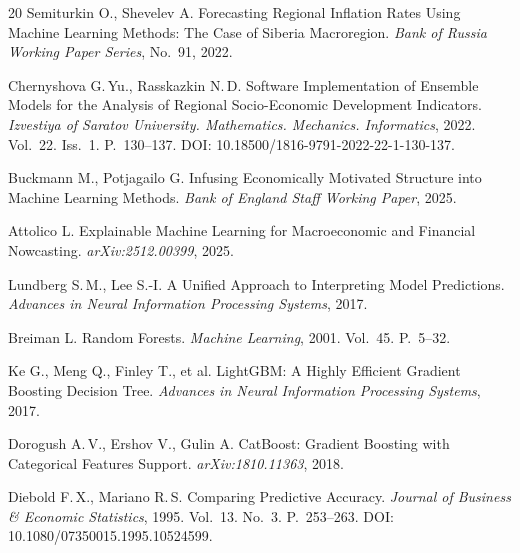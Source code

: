 \documentclass[12pt,a4paper]{article}
\begin{document}
\begin{thebibliography}{20}
Semiturkin O., Shevelev A.
Forecasting Regional Inflation Rates Using Machine Learning Methods:
The Case of Siberia Macroregion.
\textit{Bank of Russia Working Paper Series}, No.~91, 2022.

Chernyshova G.\,Yu., Rasskazkin N.\,D.
Software Implementation of Ensemble Models for the Analysis of
Regional Socio-Economic Development Indicators.
\textit{Izvestiya of Saratov University. Mathematics. Mechanics.
Informatics}, 2022. Vol.~22. Iss.~1. P.~130--137.
DOI: 10.18500/1816-9791-2022-22-1-130-137.

Buckmann M., Potjagailo G.
Infusing Economically Motivated Structure into Machine Learning Methods.
\textit{Bank of England Staff Working Paper}, 2025.

Attolico L.
Explainable Machine Learning for Macroeconomic and Financial
Nowcasting. \textit{arXiv:2512.00399}, 2025.

Lundberg S.\,M., Lee S.-I.
A Unified Approach to Interpreting Model Predictions.
\textit{Advances in Neural Information Processing Systems}, 2017.

Breiman L. Random Forests.
\textit{Machine Learning}, 2001. Vol.~45. P.~5--32.

Ke G., Meng Q., Finley T., et al.
LightGBM: A Highly Efficient Gradient Boosting Decision Tree.
\textit{Advances in Neural Information Processing Systems}, 2017.

Dorogush A.\,V., Ershov V., Gulin A.
CatBoost: Gradient Boosting with Categorical Features Support.
\textit{arXiv:1810.11363}, 2018.

Diebold F.\,X., Mariano R.\,S.
Comparing Predictive Accuracy.
\textit{Journal of Business \& Economic Statistics}, 1995.
Vol.~13. No.~3. P.~253--263.
DOI: 10.1080/07350015.1995.10524599.

\end{thebibliography}
\end{document}

